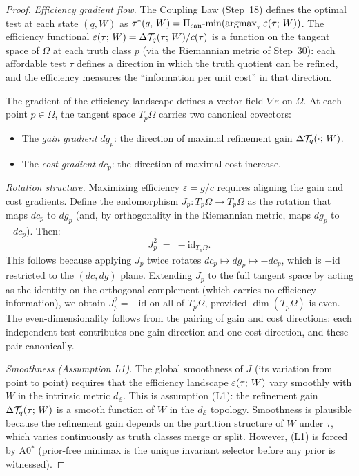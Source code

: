 \begin{proof}
\emph{Efficiency gradient flow.}  The Coupling Law (Step~18) defines
the optimal test at each state $(q, W)$ as
$\OptTest{q}{W} = \PiCanon\text{-}\!\min(\argmax_\tau \EffQ{\tau}{W})$.
The efficiency functional $\varepsilon(\tau;\, W) = \Delta\mathcal{T}_{q}(\tau;\,W)/c(\tau)$
is a function on the tangent space of $\Omega$ at each truth class $p$
(via the Riemannian metric of Step~30): each affordable test $\tau$
defines a direction in which the truth quotient can be refined, and the
efficiency measures the ``information per unit cost'' in that direction.

The gradient of the efficiency landscape defines a vector field
$\nabla \varepsilon$ on $\Omega$.  At each point $p \in \Omega$, the
tangent space $T_p\Omega$ carries two canonical covectors:
\begin{itemize}[nosep]
  \item The \emph{gain gradient} $dg_p$: the direction of maximal
        refinement gain $\Delta\mathcal{T}_{q}(\cdot;\,W)$.
  \item The \emph{cost gradient} $dc_p$: the direction of maximal cost
        increase.
\end{itemize}

\emph{Rotation structure.}  Maximizing efficiency $\varepsilon = g/c$
requires aligning the gain and cost gradients.  Define the endomorphism
$J_p \colon T_p\Omega \to T_p\Omega$ as the rotation that maps $dc_p$
to $dg_p$ (and, by orthogonality in the Riemannian metric, maps $dg_p$
to $-dc_p$).  Then:
\[
  J_p^2 \;=\; -\mathrm{id}_{T_p\Omega}.
\]
This follows because applying $J_p$ twice rotates $dc_p \mapsto dg_p
\mapsto -dc_p$, which is $-\mathrm{id}$ restricted to the $(dc, dg)$
plane.  Extending $J_p$ to the full tangent space by acting as the
identity on the orthogonal complement (which carries no efficiency
information), we obtain $J_p^2 = -\mathrm{id}$ on all of $T_p\Omega$,
provided $\dim(T_p\Omega)$ is even.  The even-dimensionality follows
from the pairing of gain and cost directions: each independent test
contributes one gain direction and one cost direction, and these pair
canonically.

\emph{Smoothness (Assumption L1).}  The global smoothness of $J$ (its
variation from point to point) requires that the efficiency landscape
$\varepsilon(\tau;\, W)$ vary smoothly with $W$ in the intrinsic metric
$d_{\mathcal{E}}$.  This is assumption (L1): the refinement gain
$\Delta\mathcal{T}_{q}(\tau;\,W)$ is a smooth function of $W$ in the
$d_{\mathcal{E}}$ topology.  Smoothness is plausible because the
refinement gain depends on the partition structure of $W$ under $\tau$,
which varies continuously as truth classes merge or split.  However,
(L1) is forced by A0$^*$ (prior-free minimax is the unique invariant selector before any prior is witnessed).


\end{proof}
